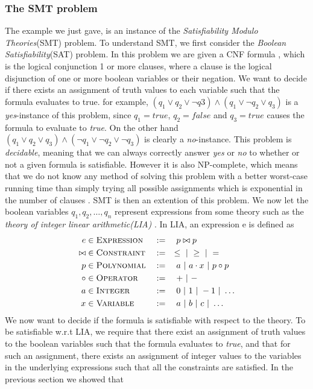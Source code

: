 	\subsubsection{The SMT problem}

	The example we just gave, is an instance of the \emph{Satisfiability Modulo Theories}(SMT) problem. To understand SMT, we first consider the \emph{Boolean Satisfiability}(SAT) problem. In this problem we are given a CNF formula , which is the logical conjunction 1 or more clauses, where a clause is the logical disjunction of one or more boolean variables or their negation.  We want to decide if there exists an assignment of truth values to each variable such that the formula evaluates to true. for example, $(q_1 \lor q_2 \lor \neg q3) \land (q_1 \lor \neg q_2 \lor q_3)$ is a \emph{yes}-instance of this problem, since $q_1 = true$, $q_2 = false$ and $q_3 = true$ causes the formula to evaluate to \emph{true}. On the other hand $(q_1 \lor q_2 \lor q_3) \land (\neg q_1 \lor \neg q_2 \lor \neg q_3)$ is clearly a \emph{no}-instance. This problem is \emph{decidable}, meaning that we can always correctly answer \emph{yes} or \emph{no} to whether or not a given formula is satisfiable. However it is also NP-complete, which means that we do not know any method of solving this problem with a better worst-case running time than simply trying all possible assignments which is exponential in the number of clauses \citep{Miltersen15}. SMT is then an extention of this problem. We now let the boolean variables $q_1, q_2, \ldots, q_n$ represent expressions from some theory such as the \emph{theory of integer linear arithmetic(LIA)} \citep{DeMoura2011}. In LIA, an expression e is defined as 
		\begin{alignat*}{3}
			e & \in \textsc{Expression} && := \quad p \bowtie p\\
			\bowtie & \in \textsc{Constraint} && := \quad \leq \ | \  \geq \ | \  =\\
			p & \in \textsc{Polynomial} && := \quad a \ | \  a\cdot x \ | \  p \circ p\\
			\circ & \in \textsc{Operator} && := \quad + \ | \  - \\
			a & \in \textsc{Integer} && := \quad 0 \ | \  1 \ | \  -1 \ | \  \ldots\\ 
			x & \in \textsc{Variable} && := \quad a \ | \  b \ | \  c \ | \  \ldots		
		\end{alignat*} 
	We now want to decide if the formula is satisfiable with respect to the theory. To be satisfiable w.r.t LIA, we require that there exist an assignment of truth values to the boolean variables such that the formula evaluates to \emph{true}, and that for such an assignment, there exists an assignment of integer values to the variables in the underlying expressions such that all the constraints are satisfied. In the previous section we showed that 
	
